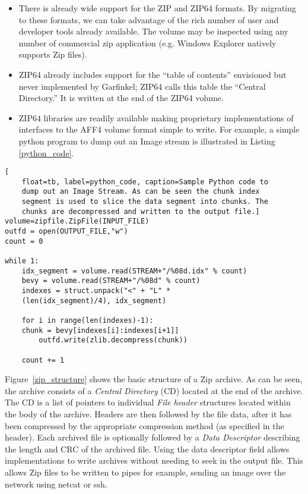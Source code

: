 \documentclass[10pt, conference]{IEEEtran}
\begin{document}
\begin{itemize}
\item There is already wide support for the ZIP and ZIP64 formats. By
  migrating to these formats, we can take advantage of the rich number
  of user and developer tools already available. The volume may be
inspected using any number of commercial zip application (e.g. Windows
Explorer natively supports Zip files).
 

\item ZIP64 already includes support for the ``table of contents''
  envisioned but never implemented by Garfinkel; ZIP64 calls this
  table the ``Central Directory.'' It is written at the end of the
  ZIP64 volume.

\item ZIP64 libraries are readily available making proprietary implementations of
interfaces to the AFF4 volume format simple to write. For example, a
simple python program to dump out an Image stream is illustrated in
Listing \ref{python_code}.

\end{itemize}

\begin{lstlisting}[
	float=tb, label=python_code, caption=Sample Python code to
	dump out an Image Stream. As can be seen the chunk index
	segment is used to slice the data segment into chunks. The
	chunks are decompressed and written to the output file.]
volume=zipfile.ZipFile(INPUT_FILE)
outfd = open(OUTPUT_FILE,"w")
count = 0

while 1:
    idx_segment = volume.read(STREAM+"/%08d.idx" % count)
    bevy = volume.read(STREAM+"/%08d" % count)
    indexes = struct.unpack("<" + "L" * 
	(len(idx_segment)/4), idx_segment)

    for i in range(len(indexes)-1):
	chunk = bevy[indexes[i]:indexes[i+1]]
        outfd.write(zlib.decompress(chunk))

    count += 1
\end{lstlisting}


Figure~\ref{zip_structure} shows the basic structure of a Zip
archive. As can be seen, the archive consists of a {\em Central Directory} (CD)
located at the end of the archive. The CD is a list of pointers to
individual {\em File header} structures located within the body of the
archive. Headers are then followed by the file data, after it has been
compressed by the appropriate compression method (as specified in the
header). Each archived file is optionally followed by a {\em Data
Descriptor} describing the length and CRC of the archived file. Using
the data descriptor field allows implementations to write archives
without needing to seek in the output file. This allows Zip files to
be written to pipes for example, sending an image over the network
using netcat or ssh.
\end{document}
